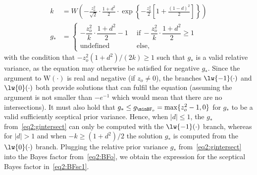 \begin{subappendices}
\begin{align}
  \label{eq2:gintersect}
  k &= W\left(-\frac{z_{o}^{2}}{\sqrt{2}} \cdot \frac{1 + d^{2}}{2} \cdot
      \exp\left\{-\frac{z_o^2}{2} \left[1 + \frac{(1 - d)^2}{2}\right]\right\}\right)
  \nonumber \\
  g_* &=
  \begin{cases}
    -\dfrac{z_o^2}{k}\cdot \dfrac{1 + d^{2}}{2} - 1 & ~~ \text{if} ~
    -\dfrac{z_o^2}{k}\cdot\dfrac{1 + d^{2}}{2} \geq 1 \\
    \text{undefined} & ~~ \text{else},
  \end{cases}
\end{align}
with the condition that $-z_o^2(1 + d^{2})/(2k) \geq 1$ such that $g_*$ is a
valid relative variance, as the equation may otherwise be satisfied for negative
$g_*$. Since the argument to $\mathrm{W}(\cdot)$ is real and negative (if
$z_{o}\neq 0$), the branches $\lw{-1}(\cdot)$ and $\lw{0}(\cdot)$ both provide
solutions that can fulfil the equation (assuming the argument is not smaller
than $-e^{-1}$ which would mean that there are no intersections). It must also
hold that $g_{*} \leq g_{\minBF_{o}} = \max\{z_{o}^{2} - 1, 0\}$ for $g_{*}$ to
be a valid sufficiently sceptical prior variance. Hence, when $|d| \leq 1$, the
$g_{*}$ from~\eqref{eq2:gintersect} can only be computed with the
$\lw{-1}(\cdot)$ branch, whereas for $|d| > 1$ and when $-k \geq (1 + d^{2})/2$
the solution $g_{*}$ is computed from the $\lw{0}(\cdot)$ branch. Plugging the
relative prior variance $g_{*}$ from~\eqref{eq2:gintersect} into the Bayes
factor from~\eqref{eq2:BFo}, we obtain the expression for the sceptical Bayes
factor in~\eqref{eq2:BFsc1}.



\end{subappendices}
